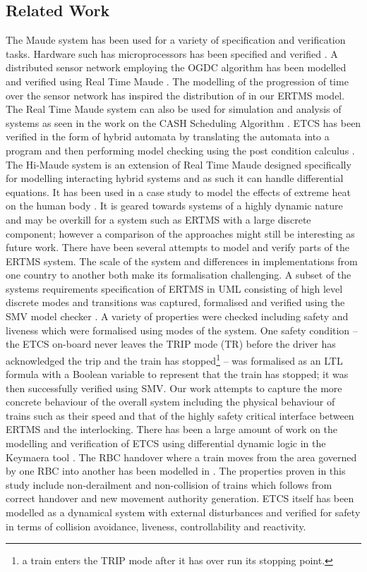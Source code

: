 \subsection*{Related Work}
The Maude system has been used for a variety of specification and verification tasks. Hardware such has microprocessors has been specified and verified \cite{NH00}. A distributed sensor network employing the OGDC algorithm has been modelled and verified using Real Time Maude \cite{PO07}. The modelling of the progression of time over the sensor network has inspired the distribution of in our ERTMS model. The Real Time Maude system can also be used for simulation and analysis of systems as seen in the work on the CASH Scheduling Algorithm \cite{PO06}. 
%
ETCS has been verified in the form of hybrid automata by translating the automata into a program and then performing model checking using the post condition calculus \cite{DI13}. The Hi-Maude system \cite{MF11} is an extension of Real Time Maude designed specifically for modelling interacting hybrid systems and as such it can handle differential equations. It has been used in a case study to model the effects of extreme heat on the human body \cite{MF12}. It is geared towards systems of a highly dynamic nature and may be overkill for a system such as ERTMS with a large discrete component; however a comparison of the approaches might still be interesting as future work.
%
There have been several attempts to model and verify parts of the ERTMS system. The scale of the system and differences in implementations from one country to another both make its formalisation challenging. A subset of the systems requirements specification of ERTMS in UML consisting of high level discrete modes and transitions was captured, formalised and verified using the SMV model checker \cite{MG14}. A variety of properties were checked including safety and liveness which were formalised using modes of the system. One safety condition -- the ETCS on-board never leaves the TRIP mode (TR) before the driver has acknowledged the trip and the train has stopped\footnote{a train enters the TRIP mode after it has over run its stopping point.} -- was formalised as an LTL formula with a Boolean variable to represent that the train has stopped; it was then successfully verified using SMV. Our work attempts to capture the more concrete behaviour of the overall system including the physical behaviour of trains such as their speed and that of the highly safety critical interface between ERTMS and the interlocking. 
%
There has been a large amount of work on the modelling and verification of ETCS using differential dynamic logic \cite{AP08} in the Keymaera tool \cite{AP08b}. The RBC handover where a train moves from the area governed by one RBC into another has been modelled in \cite{YL11}. The properties proven in this study include non-derailment and non-collision of trains which follows from correct handover and new movement authority generation. ETCS \cite{AP09} itself has been modelled as a dynamical system with external disturbances and verified for safety in terms of collision avoidance, liveness, controllability and reactivity.
